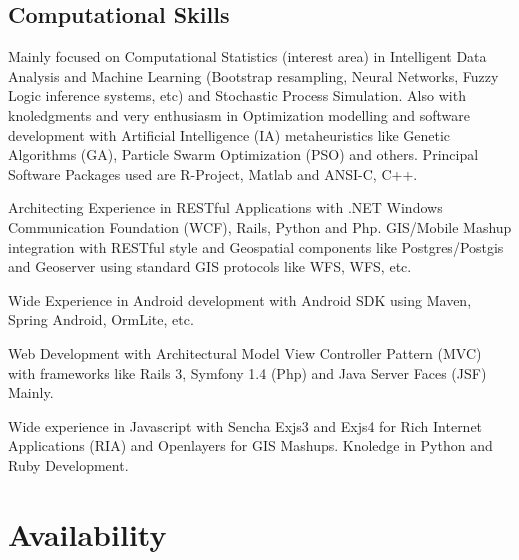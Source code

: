 \documentclass[11pt,letterpaper,roman]{moderncv}
\begin{document}
\subsection{Computational Skills}
	{Mainly focused on Computational Statistics (interest area) in Intelligent Data Analysis and Machine Learning (Bootstrap resampling, Neural Networks, Fuzzy Logic inference systems, etc)  and Stochastic Process Simulation. Also 
	with knoledgments and very enthusiasm in Optimization modelling and
software development with Artificial Intelligence (IA) metaheuristics like
Genetic Algorithms (GA), Particle Swarm Optimization (PSO) and others. Principal
Software Packages used are R-Project, Matlab and ANSI-C, C++.}

	{Architecting Experience in RESTful Applications with .NET Windows
Communication Foundation (WCF), Rails, Python and Php. GIS/Mobile Mashup
integration with RESTful style and Geospatial components like Postgres/Postgis
and Geoserver using standard GIS protocols like WFS, WFS, etc.}

	{Wide Experience in Android development with Android SDK using Maven,
Spring Android, OrmLite, etc.}

	{Web Development with Architectural Model View Controller Pattern (MVC) with frameworks like Rails 3, Symfony 1.4 (Php) and Java Server Faces (JSF) Mainly.}

	{Wide experience in Javascript with Sencha Exjs3 and Exjs4 for Rich Internet Applications (RIA) and Openlayers for GIS Mashups. Knoledge in Python and Ruby Development.}


\section{Availability}
\end{document}
